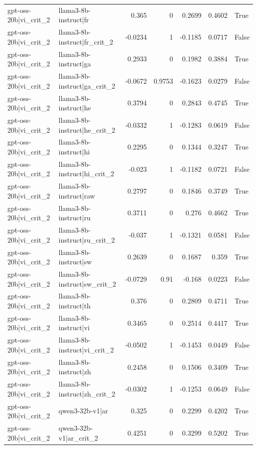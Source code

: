 \begin{table}
\begin{tabular}{l l r r r r l}
gpt-oss-20b|vi_crit_2 & llama3-8b-instruct|fr & 0.365 & 0 & 0.2699 & 0.4602 & True \\
gpt-oss-20b|vi_crit_2 & llama3-8b-instruct|fr_crit_2 & -0.0234 & 1 & -0.1185 & 0.0717 & False \\
gpt-oss-20b|vi_crit_2 & llama3-8b-instruct|ga & 0.2933 & 0 & 0.1982 & 0.3884 & True \\
gpt-oss-20b|vi_crit_2 & llama3-8b-instruct|ga_crit_2 & -0.0672 & 0.9753 & -0.1623 & 0.0279 & False \\
gpt-oss-20b|vi_crit_2 & llama3-8b-instruct|he & 0.3794 & 0 & 0.2843 & 0.4745 & True \\
gpt-oss-20b|vi_crit_2 & llama3-8b-instruct|he_crit_2 & -0.0332 & 1 & -0.1283 & 0.0619 & False \\
gpt-oss-20b|vi_crit_2 & llama3-8b-instruct|hi & 0.2295 & 0 & 0.1344 & 0.3247 & True \\
gpt-oss-20b|vi_crit_2 & llama3-8b-instruct|hi_crit_2 & -0.023 & 1 & -0.1182 & 0.0721 & False \\
gpt-oss-20b|vi_crit_2 & llama3-8b-instruct|raw & 0.2797 & 0 & 0.1846 & 0.3749 & True \\
gpt-oss-20b|vi_crit_2 & llama3-8b-instruct|ru & 0.3711 & 0 & 0.276 & 0.4662 & True \\
gpt-oss-20b|vi_crit_2 & llama3-8b-instruct|ru_crit_2 & -0.037 & 1 & -0.1321 & 0.0581 & False \\
gpt-oss-20b|vi_crit_2 & llama3-8b-instruct|sw & 0.2639 & 0 & 0.1687 & 0.359 & True \\
gpt-oss-20b|vi_crit_2 & llama3-8b-instruct|sw_crit_2 & -0.0729 & 0.91 & -0.168 & 0.0223 & False \\
gpt-oss-20b|vi_crit_2 & llama3-8b-instruct|th & 0.376 & 0 & 0.2809 & 0.4711 & True \\
gpt-oss-20b|vi_crit_2 & llama3-8b-instruct|vi & 0.3465 & 0 & 0.2514 & 0.4417 & True \\
gpt-oss-20b|vi_crit_2 & llama3-8b-instruct|vi_crit_2 & -0.0502 & 1 & -0.1453 & 0.0449 & False \\
gpt-oss-20b|vi_crit_2 & llama3-8b-instruct|zh & 0.2458 & 0 & 0.1506 & 0.3409 & True \\
gpt-oss-20b|vi_crit_2 & llama3-8b-instruct|zh_crit_2 & -0.0302 & 1 & -0.1253 & 0.0649 & False \\
gpt-oss-20b|vi_crit_2 & qwen3-32b-v1|ar & 0.325 & 0 & 0.2299 & 0.4202 & True \\
gpt-oss-20b|vi_crit_2 & qwen3-32b-v1|ar_crit_2 & 0.4251 & 0 & 0.3299 & 0.5202 & True \\

\end{tabular}
\end{table}
